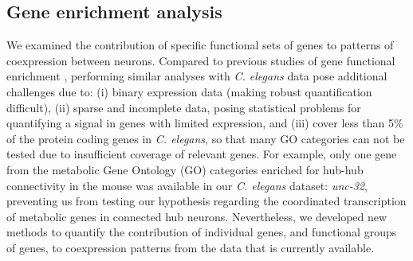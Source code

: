 \documentclass[10pt,letterpaper]{article}
\begin{document}
\subsection*{Gene enrichment analysis}
We examined the contribution of specific functional sets of genes to patterns of coexpression between neurons.
Compared to previous studies of gene functional enrichment \cite{Fulcher:2016ck, Vertes2016a, Parkes:2017dn}, performing similar analyses with \emph{C. elegans} data pose additional challenges due to:
(i) binary expression data (making robust quantification difficult),
(ii) sparse and incomplete data, posing statistical problems for quantifying a signal in genes with limited expression,
and (iii) cover less than 5\% of the protein coding genes in \emph{C. elegans}, so that many GO categories can not be tested due to insufficient coverage of relevant genes.
For example, only one gene from the metabolic Gene Ontology (GO) categories enriched for hub-hub connectivity in the mouse \cite{Fulcher:2016ck} was available in our \emph{C. elegans} dataset: \emph{unc-32}, preventing us from testing our hypothesis regarding the coordinated transcription of metabolic genes in connected hub neurons.
Nevertheless, we developed new methods to quantify the contribution of individual genes, and functional groups of genes, to coexpression patterns from the data that is currently available.

\end{document}

